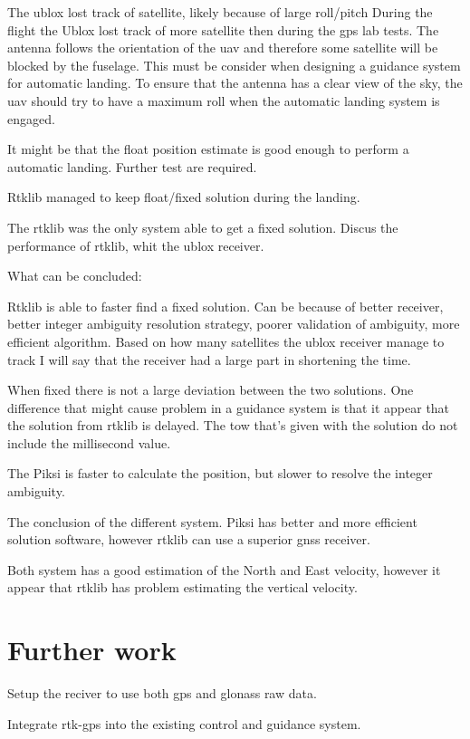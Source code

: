 The ublox lost track of satellite, likely because of large roll/pitch
During the flight the Ublox lost track of more satellite then during the \gls{gps} lab tests. The antenna follows the orientation of the \gls{uav} and therefore some satellite will be blocked by the fuselage. This must be consider when designing a guidance system for automatic landing. To ensure that the antenna has a clear view of the sky, the \gls{uav} should try to have a maximum roll when the automatic landing system is engaged.

It might be that the float position estimate is good enough to perform a automatic landing. Further test are required.

Rtklib managed to keep float/fixed solution during the landing.

The rtklib was the only system able to get a fixed solution. Discus the performance of rtklib, whit the ublox receiver. 

What can be concluded:

Rtklib is able to faster find a fixed solution. Can be because of better receiver, better integer ambiguity resolution strategy, poorer validation of ambiguity, more efficient algorithm. Based on how many satellites the ublox receiver manage to track I will say that the receiver had a large part in shortening the time.

When fixed there is not a large deviation between the two solutions. One difference that might cause problem in a guidance system is that it appear that the solution from rtklib is delayed. The \gls{tow} that's given with the solution do not include the millisecond value. 

The Piksi is faster to calculate the position, but slower to resolve the integer ambiguity. 

The conclusion of the different system. Piksi has better and more efficient solution software, however rtklib can use a superior \gls{gnss} receiver.

Both system has a good estimation of the North and East velocity, however it appear that rtklib has problem estimating the vertical velocity.


\section{Further work}
Setup the reciver to use both gps and glonass raw data.

Integrate \gls{rtk-gps} into the existing control and guidance system.

